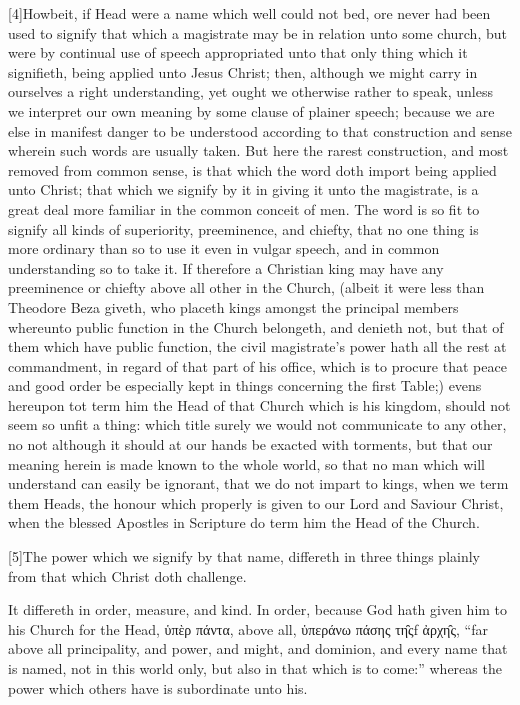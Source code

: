 [4]Howbeit, if Head were a name which well could not bed, ore never had been used to signify that which a magistrate may be in relation unto some church, but were by continual use of speech appropriated unto that only thing which it signifieth, being applied unto Jesus Christ; then, although we might carry in ourselves a right understanding, yet ought we otherwise rather to speak, unless we interpret our own meaning by some clause of plainer speech; because  we are else in manifest danger to be understood according to that construction and sense wherein such words are usually taken. But here the rarest construction, and most removed from common sense, is that which the word doth import being applied unto Christ; that which we signify by it in giving it unto the magistrate, is a great deal more familiar in the common conceit of men. The word is so fit to signify all kinds of superiority, preeminence, and chiefty, that no one thing is more ordinary than so to use it even in vulgar speech, and in common understanding so to take it. If therefore a Christian king may have any preeminence or chiefty above all other in the Church, (albeit it were less than Theodore Beza giveth, who placeth kings amongst the principal members whereunto public function in the Church belongeth, and denieth not, but that of them which have public function, the civil magistrate’s power hath all the rest at commandment, in regard of that part of his office, which is to procure that peace and good order be especially kept in things concerning the first Table;) evens hereupon tot term him the Head of that Church which is his kingdom, should not seem so unfit a thing: which title surely we would not communicate to any other, no not although it should at our hands be exacted with torments, but that our meaning herein is made known to the whole world, so that no man which will understand can easily be ignorant, that we do not impart to kings, when we term them Heads, the honour which properly is given to our Lord and Saviour  Christ, when the blessed Apostles in Scripture do term him the Head of the Church.

[5]The power which we signify by that name, differeth in three things plainly from that which Christ doth challenge.

It differeth in order, measure, and kind. In order, because God hath given him to his Church for the Head, ὑπὲρ πάντα, above all, ὑπεράνω πάσης τη̑ςf ἀρχη̑ς, “far above all principality, and power, and might, and dominion, and every name that is named, not in this world only, but also in that which is to come:” whereas the power which others have is subordinate unto his.

